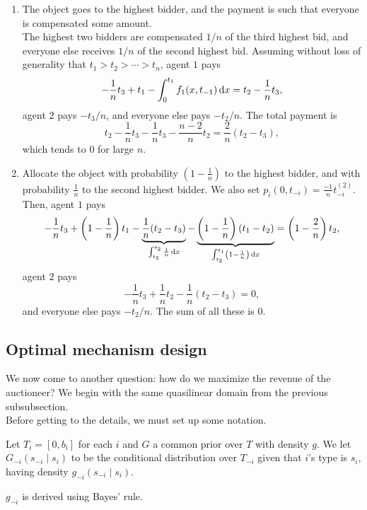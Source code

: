 		\begin{fex}
			\phantom{pain}
			\begin{enumerate}
				\item The object goes to the highest bidder, and the payment is such that everyone is compensated some amount.\\
				The highest two bidders are compensated $1/n$ of the third highest bid, and everyone else receives $1/n$ of the second highest bid. Assuming without loss of generality that $t_1 > t_2 > \cdots > t_n$, agent $1$ pays
				\[ -\frac{1}{n}t_3 + t_1 - \int_0^{t_1} f_1(x,t_{-1}) \dif x = t_2 - \frac{1}{n} t_3, \]
				agent $2$ pays $-t_3/n$, and everyone else pays $-t_2/n$. The total payment is
				\[ t_2 - \frac{1}{n}t_3 - \frac{1}{n}t_3 - \frac{n-2}{n} t_2 = \frac{2}{n}(t_2 - t_3), \]
				which tends to $0$ for large $n$.

				\item Allocate the object with probability $\left(1 - \frac{1}{n}\right)$ to the highest bidder, and with probability $\frac{1}{n}$ to the second highest bidder. We also set $p_i(0,t_{-i}) = \frac{-1}{n} t_{-i}^{(2)}$. Then, agent $1$ pays
				\[ -\frac{1}{n}t_3 + \left( 1 - \frac{1}{n} \right)t_1 - \underbrace{\frac{1}{n}(t_2-t_3)}_{\int_{t_3}^{t_2} \frac{1}{n} \dif x } - \underbrace{\left(1 - \frac{1}{n}\right)(t_1-t_2)}_{\int_{t_2}^{t_1} \left(1-\frac{1}{n}\right) \dif x } = \left( 1 - \frac{2}{n} \right)t_2, \]
				agent $2$ pays
				\[ -\frac{1}{n}t_3 + \frac{1}{n}t_2 - \frac{1}{n}(t_2-t_3) = 0, \]
				and everyone else pays $-t_2/n$. The sum of all these is $0$.
			\end{enumerate}
		\end{fex}

	\subsection{Optimal mechanism design}

		We now come to another question: how do we maximize the revenue of the auctioneer? We begin with the same quasilinear domain from the previous subsubsection. \\
		Before getting to the details, we must set up some notation.

		\begin{fdef}
			Let $T_i = [0,b_i]$ for each $i$ and $G$ a common prior over $T$ with density $g$. We let $G_{-i}(s_{-i} \mid s_i)$ to be the conditional distribution over $T_{-i}$ given that $i$'s type is $s_i$, having density $g_{-i}(s_{-i}\mid s_i)$.
		\end{fdef}
		$g_{-i}$ is derived using Bayes' rule.

